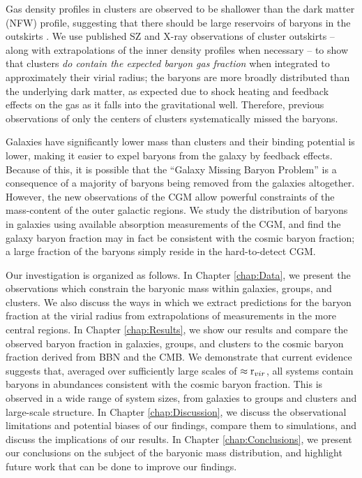 Gas density profiles in clusters are observed to be shallower than the
dark matter (NFW) profile, suggesting that there should be large
reservoirs of baryons in the outskirts . We use
published SZ and X-ray observations of cluster outskirts -- along with
extrapolations of the inner density profiles when necessary -- to show
that clusters \textit{do contain the expected baryon gas fraction}
when integrated to approximately their virial radius; the baryons are
more broadly distributed than the underlying dark matter, as expected
due to shock heating and feedback effects on the gas as it falls into
the gravitational well. Therefore, previous observations of only the
centers of clusters systematically missed the baryons.

Galaxies have significantly lower mass than clusters and their binding
potential is lower, making it easier to expel baryons from the galaxy
by feedback effects. Because of this, it is possible that the ``Galaxy
Missing Baryon Problem'' is a consequence of a majority of baryons
being removed from the galaxies altogether. However, the new
observations of the CGM allow powerful constraints of the mass-content
of the outer galactic regions. We study the distribution of baryons in
galaxies using available absorption measurements of the CGM, and find
the galaxy baryon fraction may in fact be consistent with the cosmic
baryon fraction; a large fraction of the baryons simply reside in the
hard-to-detect CGM.

Our investigation is organized as follows. In Chapter \ref{chap:Data},
we present the observations which constrain the baryonic mass within
galaxies, groups, and clusters. We also discuss the ways in which we
extract predictions for the baryon fraction at the virial radius from
extrapolations of measurements in the more central regions. In Chapter
\ref{chap:Results}, we show our results and compare the observed
baryon fraction in galaxies, groups, and clusters to the cosmic baryon
fraction derived from BBN and the CMB. We demonstrate that current
evidence suggests that, averaged over sufficiently large scales of
$\approx\textrm{r\ensuremath{_{vir}}}$, all systems contain baryons in abundances
consistent with the cosmic baryon fraction. This is
observed in a wide range of system sizes, from galaxies to groups
and clusters and large-scale structure. In Chapter \ref{chap:Discussion}, we discuss the
observational limitations and potential biases of our findings,
compare them to simulations, and discuss the implications of our
results. In Chapter \ref{chap:Conclusions}, we present our conclusions
on the subject of the baryonic mass distribution, and highlight future
work that can be done to improve our findings.

